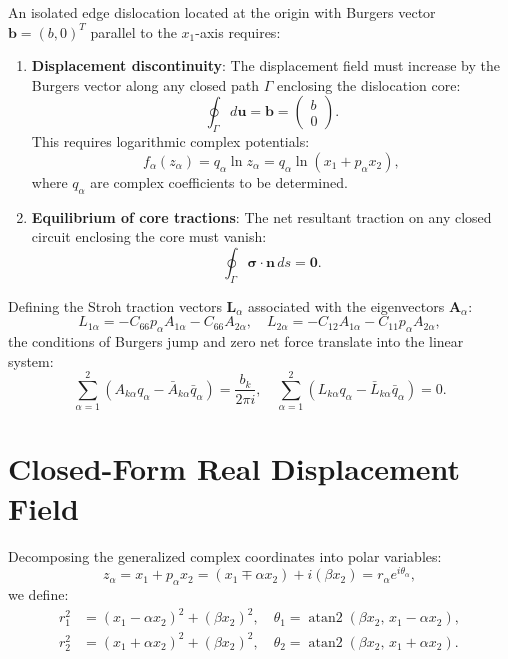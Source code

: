 \documentclass[11pt,a4paper]{article}
\begin{document}
An isolated edge dislocation located at the origin with Burgers vector $\bm{b} = (b, 0)^T$ parallel to the $x_1$-axis requires:
\begin{enumerate}
    \item \textbf{Displacement discontinuity}: The displacement field must increase by the Burgers vector along any closed path $\Gamma$ enclosing the dislocation core:
    \begin{equation}
    \oint_\Gamma d\bm{u} = \bm{b} = \begin{pmatrix} b \\ 0 \end{pmatrix}.
    \end{equation}
    This requires logarithmic complex potentials:
    \begin{equation}
    f_\alpha(z_\alpha) = q_\alpha \ln z_\alpha = q_\alpha \ln(x_1 + p_\alpha x_2),
    \end{equation}
    where $q_\alpha$ are complex coefficients to be determined.
    \item \textbf{Equilibrium of core tractions}: The net resultant traction on any closed circuit enclosing the core must vanish:
    \begin{equation}
    \oint_\Gamma \bm{\sigma} \cdot \bm{n} \, ds = \bm{0}.
    \end{equation}
\end{enumerate}

Defining the Stroh traction vectors $\bm{L}_\alpha$ associated with the eigenvectors $\bm{A}_\alpha$:
\begin{equation}
L_{1\alpha} = -C_{66} p_\alpha A_{1\alpha} - C_{66} A_{2\alpha}, \quad
L_{2\alpha} = -C_{12} A_{1\alpha} - C_{11} p_\alpha A_{2\alpha},
\end{equation}
the conditions of Burgers jump and zero net force translate into the linear system:
\begin{equation}
\sum_{\alpha=1}^2 \left( A_{k\alpha} q_\alpha - \bar{A}_{k\alpha} \bar{q}_\alpha \right) = \frac{b_k}{2\pi i}, \quad
\sum_{\alpha=1}^2 \left( L_{k\alpha} q_\alpha - \bar{L}_{k\alpha} \bar{q}_\alpha \right) = 0.
\end{equation}

\section{Closed-Form Real Displacement Field}

Decomposing the generalized complex coordinates into polar variables:
\begin{equation}
z_\alpha = x_1 + p_\alpha x_2 = (x_1 \mp \alpha x_2) + i (\beta x_2) = r_\alpha e^{i \theta_\alpha},
\end{equation}
we define:
\begin{align}
r_1^2 &= (x_1 - \alpha x_2)^2 + (\beta x_2)^2, \quad \theta_1 = \operatorname{atan2}(\beta x_2, \, x_1 - \alpha x_2), \\
r_2^2 &= (x_1 + \alpha x_2)^2 + (\beta x_2)^2, \quad \theta_2 = \operatorname{atan2}(\beta x_2, \, x_1 + \alpha x_2).
\end{align}
\end{document}

